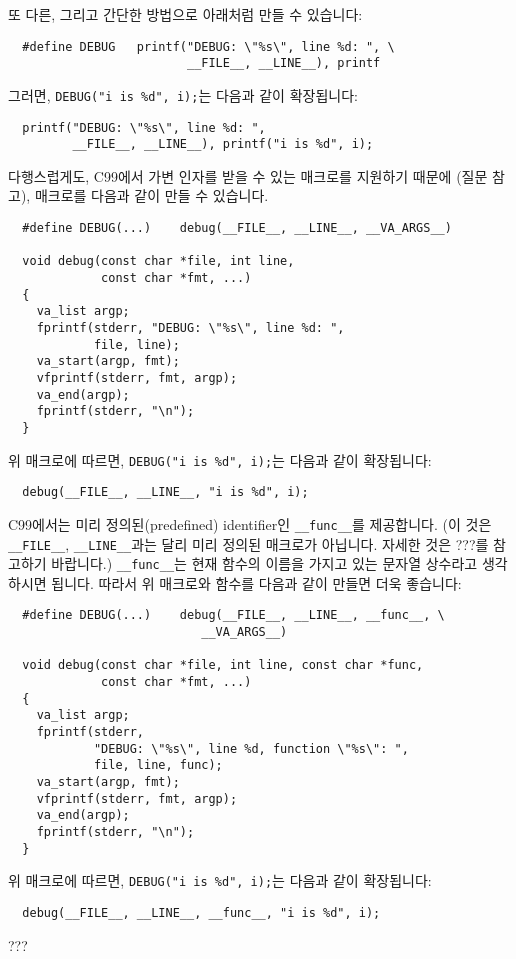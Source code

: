 \begin{faq}
	또 다른, 그리고 간단한 방법으로 아래처럼 만들 수 있습니다:
\begin{verbatim}
  #define DEBUG   printf("DEBUG: \"%s\", line %d: ", \
                         __FILE__, __LINE__), printf
\end{verbatim}
	\noindent 그러면, \verb+DEBUG("i is %d", i);+는 다음과 같이
          확장됩니다:
\begin{verbatim}
  printf("DEBUG: \"%s\", line %d: ",
         __FILE__, __LINE__), printf("i is %d", i);
\end{verbatim}

\T
	다행스럽게도, C99에서 가변 인자를 받을 수 있는 매크로를
        지원하기 때문에 (질문  참고),  매크로를
        다음과 같이 만들 수 있습니다.
\begin{verbatim}
  #define DEBUG(...)	debug(__FILE__, __LINE__, __VA_ARGS__)

  void debug(const char *file, int line,
             const char *fmt, ...)
  {
    va_list argp;
    fprintf(stderr, "DEBUG: \"%s\", line %d: ",
            file, line);
    va_start(argp, fmt);
    vfprintf(stderr, fmt, argp);
    va_end(argp);
    fprintf(stderr, "\n");
  }
\end{verbatim}
	\noindent 위 매크로에 따르면, \verb+DEBUG("i is %d", i);+는
        다음과 같이 확장됩니다:
\begin{verbatim}
  debug(__FILE__, __LINE__, "i is %d", i);
\end{verbatim}

	C99에서는 미리 정의된(predefined) identifier인
        \verb+__func__+를 제공합니다.
        (이 것은 \verb+__FILE__+, \verb+__LINE__+과는 달리
        미리 정의된 매크로가 아닙니다. 자세한 것은 ???를 참고하기
        바랍니다.)
        \verb+__func__+는 현재 함수의
        이름을 가지고 있는 문자열 상수라고 생각하시면 됩니다. 따라서
        위 매크로와 함수를 다음과 같이 만들면 더욱 좋습니다:
\begin{verbatim}
  #define DEBUG(...)	debug(__FILE__, __LINE__, __func__, \
                           __VA_ARGS__)

  void debug(const char *file, int line, const char *func,
             const char *fmt, ...)
  {
    va_list argp;
    fprintf(stderr, 
            "DEBUG: \"%s\", line %d, function \"%s\": ",
            file, line, func);
    va_start(argp, fmt);
    vfprintf(stderr, fmt, argp);
    va_end(argp);
    fprintf(stderr, "\n");
  }
\end{verbatim}
	\noindent 위 매크로에 따르면, \verb+DEBUG("i is %d", i);+는
        다음과 같이 확장됩니다:
\begin{verbatim}
  debug(__FILE__, __LINE__, __func__, "i is %d", i);
\end{verbatim}

\R
	\cite{c89} ???
\end{faq}

%
%
